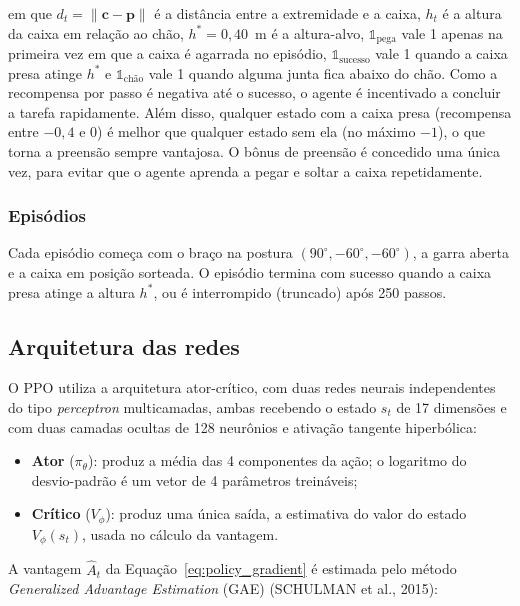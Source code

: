 \noindent em que $d_t = \lVert \mathbf{c} - \mathbf{p} \rVert$ é a distância entre a extremidade e a caixa, $h_t$ é a altura da caixa em relação ao chão, $h^{*} = 0{,}40$~m é a altura-alvo, $\mathbb{1}_{\text{pega}}$ vale 1 apenas na primeira vez em que a caixa é agarrada no episódio, $\mathbb{1}_{\text{sucesso}}$ vale 1 quando a caixa presa atinge $h^{*}$ e $\mathbb{1}_{\text{chão}}$ vale 1 quando alguma junta fica abaixo do chão. Como a recompensa por passo é negativa até o sucesso, o agente é incentivado a concluir a tarefa rapidamente. Além disso, qualquer estado com a caixa presa (recompensa entre $-0{,}4$ e $0$) é melhor que qualquer estado sem ela (no máximo $-1$), o que torna a preensão sempre vantajosa. O bônus de preensão é concedido uma única vez, para evitar que o agente aprenda a pegar e soltar a caixa repetidamente.

\subsubsection{Episódios}

Cada episódio começa com o braço na postura $(90^\circ, -60^\circ, -60^\circ)$, a garra aberta e a caixa em posição sorteada. O episódio termina com sucesso quando a caixa presa atinge a altura $h^{*}$, ou é interrompido (truncado) após 250 passos.

\subsection{Arquitetura das redes}

O PPO utiliza a arquitetura ator-crítico, com duas redes neurais independentes do tipo \textit{perceptron} multicamadas, ambas recebendo o estado $s_t$ de 17 dimensões e com duas camadas ocultas de 128 neurônios e ativação tangente hiperbólica:

\begin{itemize}
    \item \textbf{Ator} ($\pi_\theta$): produz a média das 4 componentes da ação; o logaritmo do desvio-padrão é um vetor de 4 parâmetros treináveis;
    \item \textbf{Crítico} ($V_\phi$): produz uma única saída, a estimativa do valor do estado $V_\phi(s_t)$, usada no cálculo da vantagem.
\end{itemize}

A vantagem $\hat{A}_t$ da Equação~\ref{eq:policy_gradient} é estimada pelo método \textit{Generalized Advantage Estimation} (GAE) (SCHULMAN et al., 2015):

